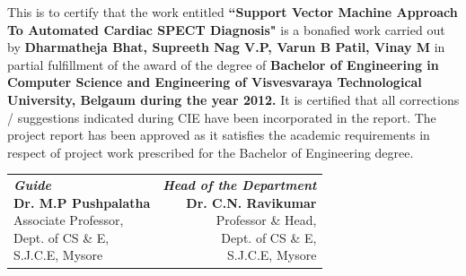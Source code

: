 \documentclass[11pt,a4paper]{report}
\begin{document}
\begin{titlepage}
{\justifying
\hspace{0.9in}
This is to certify that the work entitled \textbf{``Support Vector Machine Approach To Automated Cardiac SPECT Diagnosis"} is a bonafied work carried out by \textbf{Dharmatheja Bhat, Supreeth Nag V.P, Varun B Patil, Vinay M} in partial fulfillment of the award of the degree of \textbf{Bachelor of Engineering in Computer Science and Engineering of Visvesvaraya Technological University, Belgaum during the year 2012.} It is certified that all corrections / suggestions indicated during CIE have been incorporated in the report. The project report has been approved as it satisfies the academic requirements in respect of project work prescribed for the Bachelor of Engineering degree.}\\
\vfill


\hspace{-0.9cm}	%
\begin{tabular*}{\textwidth}{lr}
\parbox{9.5cm}{\emph{\textbf{Guide}} \newline \textbf{Dr. M.P Pushpalatha} \newline Associate Professor, \newline Dept. of CS \& E, \newline S.J.C.E, Mysore} 
& \parbox{5cm}{\emph{\textbf{Head of the Department}} \newline \textbf{Dr. C.N. Ravikumar} \newline Professor \& Head, \newline Dept. of CS \& E, \newline S.J.C.E, Mysore} \\
\end{tabular*}
\vspace{1.5cm}




\end{titlepage}
\end{document}
